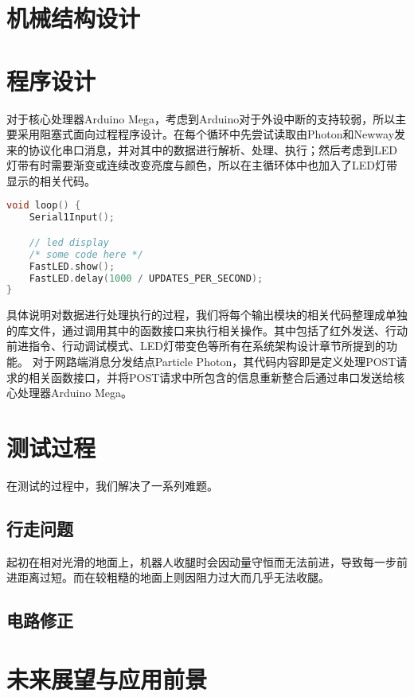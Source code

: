 \section{机械结构设计}

\section{程序设计}
    \hspace{1.5em}对于核心处理器Arduino Mega，考虑到Arduino对于外设中断的支持较弱，所以主要采用阻塞式面向过程程序设计。在每个循环中先尝试读取由Photon和Newway发来的协议化串口消息，并对其中的数据进行解析、处理、执行；然后考虑到LED灯带有时需要渐变或连续改变亮度与颜色，所以在主循环体中也加入了LED灯带显示的相关代码。
    \begin{lstlisting}[language={C++}]
void loop() {
    Serial1Input();

    // led display
    /* some code here */
    FastLED.show();
    FastLED.delay(1000 / UPDATES_PER_SECOND);
}
    \end{lstlisting}
    \hspace{1.5em}具体说明对数据进行处理执行的过程，我们将每个输出模块的相关代码整理成单独的库文件，通过调用其中的函数接口来执行相关操作。其中包括了红外发送、行动前进指令、行动调试模式、LED灯带变色等所有在系统架构设计章节所提到的功能。
    \hspace{1.5em}对于网路端消息分发结点Particle Photon，其代码内容即是定义处理POST请求的相关函数接口，并将POST请求中所包含的信息重新整合后通过串口发送给核心处理器Arduino Mega。

\section{测试过程}
    \hspace{1.5em}在测试的过程中，我们解决了一系列难题。
    \subsection{行走问题}
    \hspace{1.5em}起初在相对光滑的地面上，机器人收腿时会因动量守恒而无法前进，导致每一步前进距离过短。而在较粗糙的地面上则因阻力过大而几乎无法收腿。

    \subsection{电路修正}
    \hspace{1.5em}

\section{未来展望与应用前景}




